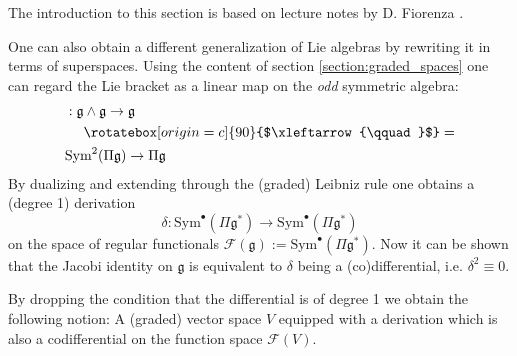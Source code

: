     The introduction to this section is based on lecture notes by D. Fiorenza \cite{bv_formalism}.

    One can also obtain a different generalization of Lie algebras by rewriting it in terms of superspaces. Using the content of section \ref{section:graded_spaces} one can regard the Lie bracket as a linear map on the \textit{odd} symmetric algebra:
    \begin{align*}
        [\cdot,\cdot]&:\mathfrak{g}\wedge\mathfrak{g}\rightarrow\mathfrak{g}\\
        &\quad\ \rotatebox[origin=c]{90}{$\xleftarrow{\qquad}$}=\\
        &\text{Sym}^2(\Pi\mathfrak{g})\rightarrow\Pi\mathfrak{g}
    \end{align*}
    By dualizing and extending through the (graded) Leibniz rule one obtains a (degree 1) derivation \[\delta:\text{Sym}^\bullet(\Pi\mathfrak{g}^*)\rightarrow\text{Sym}^\bullet(\Pi\mathfrak{g}^*)\] on the space of regular functionals $\mathcal{F}(\mathfrak{g}):=\text{Sym}^\bullet(\Pi\mathfrak{g}^*)$. Now it can be shown that the Jacobi identity on $\mathfrak{g}$ is equivalent to $\delta$ being a (co)differential, i.e. $\delta^2\equiv0$.


    By dropping the condition that the differential is of degree 1 we obtain the following notion:    A (graded) vector space $V$ equipped with a derivation which is also a codifferential on the function space $\mathcal{F}(V)$.

